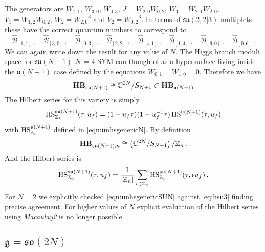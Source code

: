 \documentclass[main.tex]{subfiles}
\begin{document}
The generators are $W_{1,1}$, $W_{3,0}$, $W_{0,3}$, $\widetilde{J}=W_{2,0}W_{0,2}$, $\widetilde{W}_1=W_{2,1}W_{2,0}$, $\widetilde{V}_1=W_{1,2}W_{0,2}$, $\widetilde{W}_2={W_{2,0}}^3$ and $\widetilde{V}_2={W_{0,2}}^3$. In terms of $\mathfrak{su}(2,2|3)$ multiplets these have the correct quantum numbers to correspond to
\begin{equation}
{\hat{\mathcal{B}}_{[1,1]}}\,,\quad {\hat{\mathcal{B}}_{[3,0]}}\,,\quad {\hat{\mathcal{B}}_{[0,3]}}\,,\quad {\hat{\mathcal{B}}_{[2,2]}}\,,\quad {\hat{\mathcal{B}}_{[4,1]}}\,,\quad {\hat{\mathcal{B}}_{[1,4]}}\,,\quad {\hat{\mathcal{B}}_{[6,0]}}\,,\quad {\hat{\mathcal{B}}_{[0,6]}}\,.
\end{equation}
We can again write down the result for any value of $N$. The Higgs branch moduli space for $\mathfrak{su}(N+1)$ $\mathcal{N}=4$ SYM can though of as a hypersurface living inside the $\mathfrak{u}(N+1)$ case defined by the equations $W_{0,1}=W_{1,0}=0$. Therefore we have  \cite{Seiberg:1997ax,Forcella:2008bb}
\begin{equation}
\mathbf{HB}_{\mathfrak{su}(N+1)}\cong\mathbb{C}^{2N}/S_{N+1}\subset \mathbf{HB}_{\mathfrak{u}(N+1)}
\end{equation}
The Hilbert series for this variety is simply
\begin{equation}
\textrm{HS}_{\mathbb{Z}_1}^{\mathfrak{su}(N+1)}(\tau,u_f)=(1-u_f\tau)(1-u_f^{-1}\tau)\,\textrm{HS}^{\mathfrak{u}(N+1)}(\tau,u_f)
\end{equation}
with $\textrm{HS}_{\mathbb{Z}_1}^{\mathfrak{u}(N+1)}$ defined in \eqref{eqn:unhsgenericN}.
By definition
\begin{equation}
\mathbf{HB}_{\mathfrak{su}(N+1),n}\cong\left(\mathbb{C}^{2N}/S_{N+1}\right)/\mathbb{Z}_{n}\,.
\end{equation}
And the Hilbert series is 
\begin{equation}
\textrm{HS}_{\mathbb{Z}_n}^{\mathfrak{su}(N+1)}(\tau,u_f)=\frac{1}{|\mathbb{Z}_n|}\sum_{\epsilon\in\mathbb{Z}_n}\textrm{HS}_{\mathbb{Z}_1}^{\mathfrak{su}(N+1)}(\tau,\epsilon u_f)\label{eqn:unhsgenericSUN}\,.
\end{equation}
For $N=2$ we explicitly checked \eqref{eqn:unhsgenericSUN} against \eqref{eq:hsu3} finding precise agreement. For higher values of $N$ explicit evaluation of the Hilbert series using \textit{Macaulay2} is no longer possible.

\subsection{\texorpdfstring{$\mathfrak{g}=\mathfrak{so}(2N)$}{g=so(2N)}} 
\end{document}
